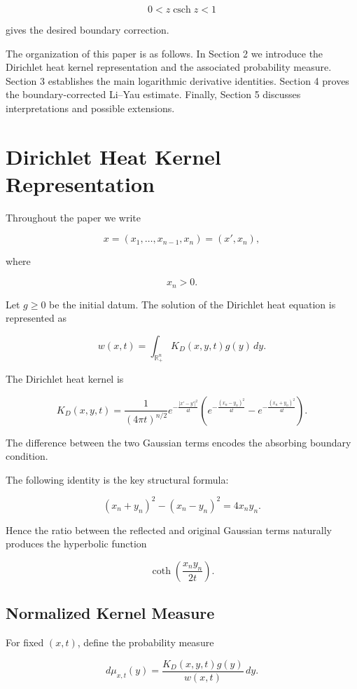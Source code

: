 \documentclass[11pt]{amsart}
\DeclareMathOperator{\csch}{csch}
\theoremstyle{definition}
\theoremstyle{remark}
\begin{document}
\[
0<z\csch z<1
\]

gives the desired boundary correction.


The organization of this paper is as follows. In Section 2 we
introduce the Dirichlet heat kernel representation and the associated
probability measure. Section 3 establishes the main logarithmic
derivative identities. Section 4 proves the boundary-corrected
Li--Yau estimate. Finally, Section 5 discusses interpretations and
possible extensions.


\section{Dirichlet Heat Kernel Representation}


Throughout the paper we write

\[
x=(x_1,\ldots,x_{n-1},x_n)
=(x',x_n),
\]

where

\[
x_n>0.
\]


Let $g\geq0$ be the initial datum. The solution of the Dirichlet
heat equation is represented as

\[
w(x,t)
=
\int_{\mathbb R^n_+}
K_D(x,y,t)g(y)\,dy .
\]


The Dirichlet heat kernel is

\[
K_D(x,y,t)
=
\frac1{(4\pi t)^{n/2}}
e^{-\frac{|x'-y'|^2}{4t}}
\left(
e^{-\frac{(x_n-y_n)^2}{4t}}
-
e^{-\frac{(x_n+y_n)^2}{4t}}
\right).
\]


The difference between the two Gaussian terms encodes the absorbing
boundary condition.

The following identity is the key structural formula:

\[
(x_n+y_n)^2-(x_n-y_n)^2
=
4x_ny_n .
\]

Hence the ratio between the reflected and original Gaussian terms
naturally produces the hyperbolic function

\[
\coth\left(\frac{x_ny_n}{2t}\right).
\]

\subsection{Normalized Kernel Measure}


For fixed $(x,t)$, define the probability measure

\[
d\mu_{x,t}(y)
=
\frac{
K_D(x,y,t)g(y)
}{
w(x,t)
}
\,dy .
\]
\end{document}
